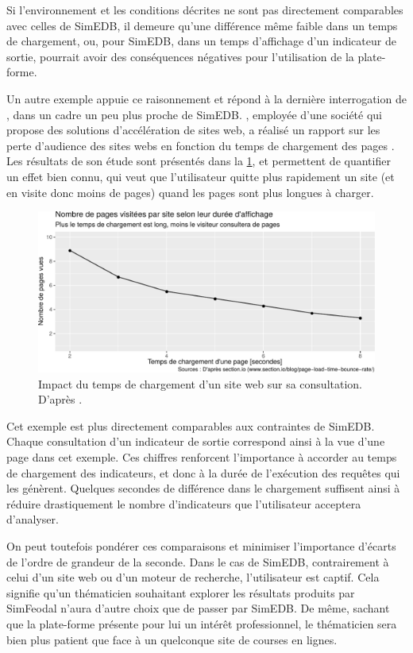 Si l'environnement et les conditions décrites ne sont pas directement comparables avec celles de SimEDB, il demeure qu'une différence même faible dans un temps de chargement, ou, pour SimEDB, dans un temps d'affichage d'un indicateur de sortie, pourrait avoir des conséquences négatives pour l'utilisation de la plate-forme.

Un autre exemple appuie ce raisonnement et répond à la dernière interrogation de \citeauthor{patel_speed_2011}, dans un cadre un peu plus proche de SimEDB.
, employée d'une société qui propose des solutions d'accélération de sites web, a réalisé un rapport sur les perte d'audience des sites webs en fonction du temps de chargement des pages \autocite{elliott_how_2017}.
Les résultats de son étude sont présentés dans la \cref{fig:page-abandon}, et permettent de quantifier un effet bien connu, qui veut que l'utilisateur quitte plus rapidement un site (et en visite donc moins de pages) quand les pages sont plus longues à charger.

\begin{figure}[H]
	\centering
	\includegraphics[width=.9\linewidth]{img/abandon_pages.pdf}
	\caption[Impact du temps de chargement d'un site web sur sa consultation.]{Impact du temps de chargement d'un site web sur sa consultation. D'après \textcite{elliott_how_2017}.}
	\label{fig:page-abandon}
\end{figure}

Cet exemple est plus directement comparables aux contraintes de SimEDB.
Chaque consultation d'un indicateur de sortie correspond ainsi à la vue d'une page dans cet exemple.
Ces chiffres renforcent l'importance à accorder au temps de chargement des indicateurs, et donc à la durée de l'exécution des requêtes qui les génèrent.
Quelques secondes de différence dans le chargement suffisent ainsi à réduire drastiquement le nombre d'indicateurs que l'utilisateur acceptera d'analyser.

On peut toutefois pondérer ces comparaisons et minimiser l'importance d'écarts de l'ordre de grandeur de la seconde.
Dans le cas de SimEDB, contrairement à celui d'un site web ou d'un moteur de recherche, l'utilisateur est \og captif\fg{}.
Cela signifie qu'un thématicien souhaitant explorer les résultats produits par SimFeodal n'aura d'autre choix que de passer par SimEDB.
De même, sachant que la plate-forme présente pour lui un intérêt professionnel, le thématicien sera bien plus patient que face à un quelconque site de courses en lignes.

